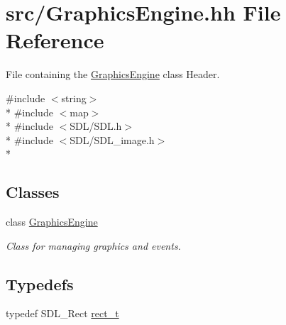 \hypertarget{GraphicsEngine_8hh}{\section{src/\-Graphics\-Engine.hh File Reference}
\label{GraphicsEngine_8hh}
}


File containing the \hyperlink{classGraphicsEngine}{Graphics\-Engine} class Header.  


{\ttfamily \#include $<$string$>$}\\*
{\ttfamily \#include $<$map$>$}\\*
{\ttfamily \#include $<$S\-D\-L/\-S\-D\-L.\-h$>$}\\*
{\ttfamily \#include $<$S\-D\-L/\-S\-D\-L\-\_\-image.\-h$>$}\\*
\subsection*{Classes}
\begin{DoxyCompactItemize}
\item 
class \hyperlink{classGraphicsEngine}{Graphics\-Engine}
\begin{DoxyCompactList}\small\item\em Class for managing graphics and events. \end{DoxyCompactList}\end{DoxyCompactItemize}
\subsection*{Typedefs}
\begin{DoxyCompactItemize}
\item 
typedef S\-D\-L\-\_\-\-Rect \hyperlink{GraphicsEngine_8hh_a9a150f1ad43ec7de65cfe698cdae8bee}{rect\-\_\-t}
\end{DoxyCompactItemize}
